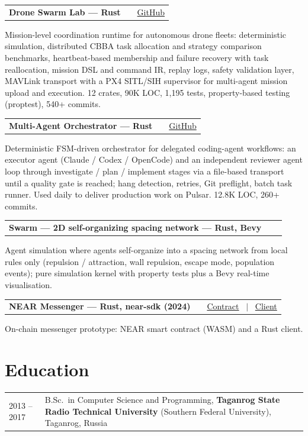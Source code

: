 \documentclass[a4paper,11pt]{article}
\makeatletter
\newenvironment{jobshort}[2]
    {
    \begin{tabularx}{\linewidth}{@{}l X r@{}}
    \textbf{#1} & \hfill &  #2 \\[3.75pt]
    \end{tabularx}
    }
    {
    }
\makeatother
\begin{document}
\begin{jobshort}{\textbf{Drone Swarm Lab} --- Rust}{\href{https://github.com/formiat/drone-swarm-lab}{GitHub}}
Mission-level coordination runtime for autonomous drone fleets: deterministic simulation, distributed CBBA task allocation and strategy comparison benchmarks, heartbeat-based membership and failure recovery with task reallocation, mission DSL and command IR, replay logs, safety validation layer, MAVLink transport with a PX4 SITL/SIH supervisor for multi-agent mission upload and execution. 12 crates, 90K LOC, 1,195 tests, property-based testing (proptest), 540+ commits.
\end{jobshort}

\begin{jobshort}{\textbf{Multi-Agent Orchestrator} --- Rust}{\href{https://github.com/formiat/multi-agent-orchestrator-rs}{GitHub}}
Deterministic FSM-driven orchestrator for delegated coding-agent workflows: an executor agent (Claude / Codex / OpenCode) and an independent reviewer agent loop through investigate / plan / implement stages via a file-based transport until a quality gate is reached; hang detection, retries, Git preflight, batch task runner. Used daily to deliver production work on Pulsar. 12.8K LOC, 260+ commits.
\end{jobshort}

\begin{jobshort}{\textbf{Swarm --- 2D self-organizing spacing network} --- Rust, Bevy}{}
Agent simulation where agents self-organize into a spacing network from local rules only (repulsion / attraction, wall repulsion, escape mode, population events); pure simulation kernel with property tests plus a Bevy real-time visualisation.
\end{jobshort}

\begin{jobshort}{\textbf{NEAR Messenger} --- Rust, near-sdk (2024)}{\href{https://github.com/formiat/near-messenger-contract}{Contract} \ $|$ \ \href{https://github.com/formiat/near-messenger-client}{Client}}
On-chain messenger prototype: NEAR smart contract (WASM) and a Rust client.
\end{jobshort}

\section{Education}
\begin{tabularx}{\linewidth}{@{}l X@{}}	
2013 -- 2017 & B.Sc.\ in Computer Science and Programming, \textbf{Taganrog State Radio Technical University} (Southern Federal University), Taganrog, Russia \\
\end{tabularx}
\end{document}
